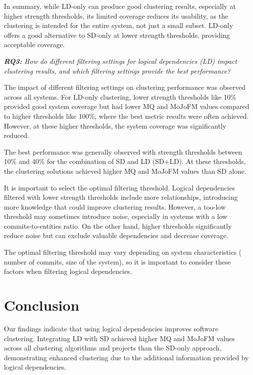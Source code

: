 \documentclass{ieeeaccess}
\begin{document}
In summary, while LD-only can produce good clustering results, especially at higher strength thresholds, its limited coverage reduces its usability, as the clustering is intended for the entire system, not just a small subset. LD-only offers a good alternative to SD-only at lower strength thresholds, providing acceptable coverage.

\textit{ \textbf{RQ3:} How do different filtering settings for logical dependencies (LD) impact clustering results, and which filtering settings provide the best performance?}

The impact of different filtering settings on clustering performance was observed across all systems. For LD-only clustering, lower strength thresholds like 10\% provided good system coverage but had lower MQ and MoJoFM values compared to higher thresholds like 100\%, where the best metric results were often achieved. However, at these higher thresholds, the system coverage was significantly reduced.

The best performance was generally observed with strength thresholds between 10\% and 40\% for the combination of SD and LD (SD+LD). At these thresholds, the clustering solutions achieved higher MQ and MoJoFM values than SD alone.

It is important to select the optimal filtering threshold. Logical dependencies filtered with lower strength thresholds include more relationships, introducing more knowledge that could improve clustering results. However, a too-low threshold may sometimes introduce noise, especially in systems with a low commits-to-entities ratio. On the other hand, higher thresholds significantly reduce noise but can exclude valuable dependencies and decrease coverage.

The optimal filtering threshold may vary depending on system characteristics ( number of commits, size of the system), so it is important to consider these factors when filtering logical dependencies.


\section{Conclusion}
\label{sec:conclusion}
Our findings indicate that using logical dependencies improves software clustering. Integrating LD with SD achieved higher MQ and MoJoFM values across all clustering algorithms and projects than the SD-only approach, demonstrating enhanced clustering due to the additional information provided by logical dependencies.
\end{document}
